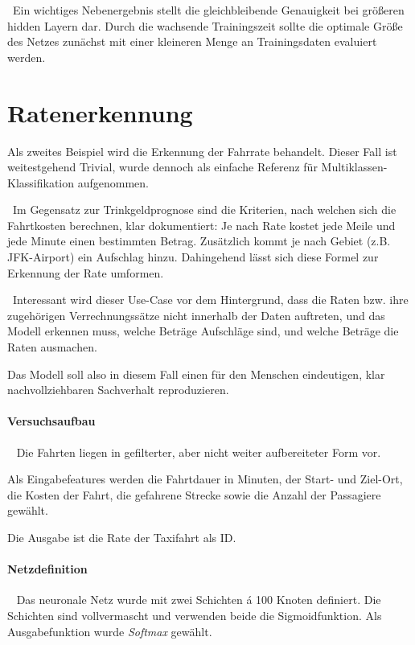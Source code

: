 ~\newline Ein wichtiges Nebenergebnis stellt die gleichbleibende Genauigkeit bei größeren hidden Layern dar. Durch die wachsende Trainingszeit sollte die optimale Größe des Netzes zunächst mit einer kleineren Menge an Trainingsdaten evaluiert werden.  
\newpage
\section{Ratenerkennung}
\label{sec:RatePred}
Als zweites Beispiel wird die Erkennung der Fahrrate behandelt. Dieser Fall ist weitestgehend Trivial, wurde dennoch als einfache Referenz für Multiklassen-Klassifikation aufgenommen. 

~\newline Im Gegensatz zur Trinkgeldprognose sind die Kriterien, nach welchen sich die Fahrtkosten berechnen, klar dokumentiert: Je nach Rate kostet jede Meile und jede Minute einen bestimmten Betrag. Zusätzlich kommt je nach Gebiet (z.B. JFK-Airport) ein Aufschlag hinzu. Dahingehend lässt sich diese Formel zur Erkennung der Rate umformen.

~\newline Interessant wird dieser Use-Case vor dem Hintergrund, dass die Raten bzw. ihre zugehörigen Verrechnungssätze nicht innerhalb der Daten auftreten, und das Modell erkennen muss, welche Beträge Aufschläge sind, und welche Beträge die Raten ausmachen. 

Das Modell soll also in diesem Fall einen für den Menschen eindeutigen, klar nachvollziehbaren Sachverhalt reproduzieren. 
\paragraph{Versuchsaufbau} ~\newline
Die Fahrten liegen in gefilterter, aber nicht weiter aufbereiteter Form vor. 

Als Eingabefeatures werden die Fahrtdauer in Minuten, der Start- und Ziel-Ort, die Kosten der Fahrt, die gefahrene Strecke sowie die Anzahl der Passagiere gewählt. 

Die Ausgabe ist die Rate der Taxifahrt als ID.
\paragraph{Netzdefinition} ~\newline
Das neuronale Netz wurde mit zwei Schichten á 100 Knoten definiert. Die Schichten sind vollvermascht und verwenden beide die Sigmoidfunktion. Als Ausgabefunktion wurde \textit{Softmax} gewählt.

